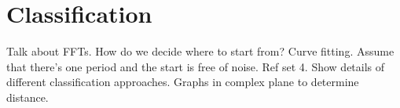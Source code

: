 
\section{Classification}
Talk about FFTs.
How do we decide where to start from?  Curve fitting.
Assume that there's one period and the start is free of noise.  Ref set 4.
Show details of different classification approaches.
Graphs in complex plane to determine distance.